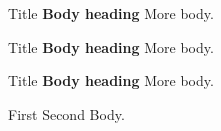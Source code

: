 
\begin{note}{Title}%
{\bfseries Body heading}
More body.
\end{note}

\begin{note}{Title}%
{\bfseries Body heading} More body.
\end{note}

\begin{note}[Shown]{Title}%
{\bfseries Body heading}
More body.
\end{note}


\begin{mixed}{First}%
{Second}
Body.
\end{mixed}
